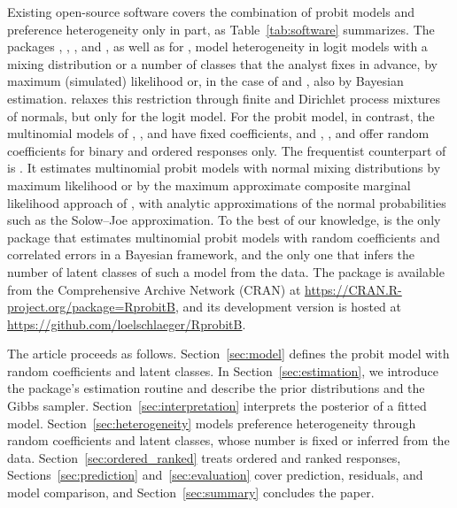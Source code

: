 \documentclass[article,shortnames]{jss}
\newcommand{\fct}[1]{\code{#1()}}
\begin{document}
Existing open-source software covers the combination of probit models and
preference heterogeneity only in part, as Table~\ref{tab:software} summarizes.
The  packages  \citep{Croissant2020}, 
\citep{Sarrias2017},  \citep{Helveston2023}, and 
\citep{Hess2019}, as well as  \citep{Bierlaire2020, Bierlaire2025}
for  \citep{VanRossum2009}, model heterogeneity in logit models
with a mixing distribution or a number of classes that the analyst fixes in
advance, by maximum (simulated) likelihood or, in the case of  and
, also by Bayesian estimation.  \citep{Rossi2025}
relaxes this restriction through finite and Dirichlet process mixtures of
normals, but only for the logit model. For the probit model, in contrast, the
multinomial models of , , and 
\citep{Imai2005b, Imai2026} have fixed coefficients, and ,
, and  \citep{Sarrias2016} offer random coefficients
for binary and ordered responses only. The frequentist counterpart of
 is  \citep{Bauer2026}. It estimates multinomial
probit models with normal mixing distributions by maximum likelihood or by the
maximum approximate composite marginal likelihood approach of \citet{Bhat2011},
with analytic approximations of the normal probabilities such as the Solow--Joe
approximation. To the best of our knowledge,  is the only package
that estimates multinomial probit models with random coefficients and correlated
errors in a Bayesian framework, and the only one that infers the number of
latent classes of such a model from the data. The package is available from the
Comprehensive  Archive Network (CRAN) at
\url{https://CRAN.R-project.org/package=RprobitB}, and its development version
is hosted at \url{https://github.com/loelschlaeger/RprobitB}.

The article proceeds as follows. Section~\ref{sec:model} defines the probit
model with random coefficients and latent classes. In
Section~\ref{sec:estimation}, we introduce the package's estimation routine
\fct{fit} and describe the prior distributions and the Gibbs sampler.
Section~\ref{sec:interpretation} interprets the posterior of a fitted model.
Section~\ref{sec:heterogeneity} models preference heterogeneity through random
coefficients and latent classes, whose number is fixed or inferred from the
data. Section~\ref{sec:ordered_ranked} treats ordered and ranked responses,
Sections~\ref{sec:prediction} and~\ref{sec:evaluation} cover prediction,
residuals, and model comparison, and Section~\ref{sec:summary} concludes the
paper.
\end{document}
